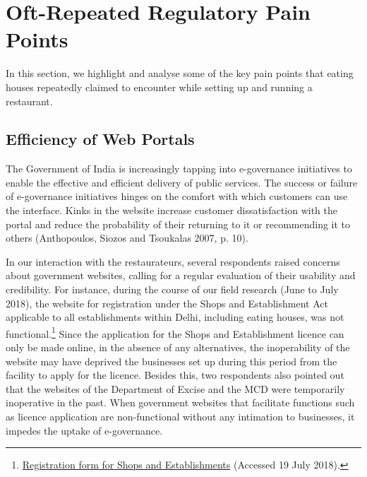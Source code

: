 \documentclass[a4paper, 12pt]{article}
\begin{document}




		\section{Oft-Repeated Regulatory Pain Points}
		\label{sec:3}
		
		In this section, we highlight and analyse some of the key pain points that eating houses repeatedly claimed to encounter while setting up and running a restaurant.
		
		\subsection{Efficiency of Web Portals}
		The Government of India is increasingly tapping into e-governance initiatives to enable the effective and efficient delivery of public services. The success or failure of e-governance initiatives hinges on the comfort with which customers can use the 
interface. Kinks in the website increase customer dissatisfaction with the portal and reduce the probability of their returning to it or recommending it to others (Anthopoulos, Siozos and Tsoukalas 2007, p. 10). 
		
		In our interaction with the restaurateurs, several respondents raised concerns about government websites, calling for a regular evaluation of their usability and credibility. For instance, during the course of our field research (June to July 2018), the 
website for registration under the Shops and Establishment Act applicable to all establishments within Delhi, including eating houses, was not functional.\footnote{\href{https://bit.ly/2xfB6UJ}{Registration form for Shops and Establishments} (Accessed 19 July 
2018).} Since the application for the Shops and Establishment licence can only be made online, in the absence of any alternatives, the inoperability of the website may have deprived the businesses set up during this period from the facility to apply for the licence. 
Besides this, two respondents also pointed out that the websites of the Department of Excise and the MCD were temporarily inoperative in the past. When government websites that facilitate functions such as licence application are non-functional without any 
intimation to businesses, it impedes the uptake of e-governance.
		
\end{document}
